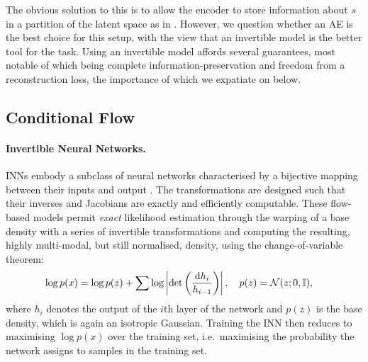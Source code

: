 The obvious solution to this is to allow the encoder to store information about $s$ in a partition
of the latent space as in  \citet{creager2019flexibly}. 
%
However, we question whether an \ac{AE} is the best choice for this setup, with the view that an
invertible model is the better tool for the task. 
%
Using an invertible model affords several guarantees, most notable of which being complete
information-preservation and freedom from a reconstruction loss, the importance of which we
expatiate on below.

\subsection{Conditional Flow}\label{cflow}
%
\paragraph{Invertible Neural Networks.}
%
\Acp{INN} embody a subclass of neural networks characterised by a bijective mapping between their
inputs and output \citep{Dinh2014}. 
%
The transformations are designed such that their inverses and Jacobians are exactly and efficiently
computable.
%
These flow-based models permit \emph{exact} likelihood estimation \citep{normflows2015} through the
warping of a base density with a series of invertible transformations and computing the resulting,
highly multi-modal, but still normalised, density, using the change-of-variable theorem:
%
\begin{align}
\begin{split}
  \log p(x) &= \log p(z) + 
   \sum \log \left| \det\left( \frac{\diff h_i}{ h_{i-1}}\right) \right|, %
  \quad p(z) = \gN(z; 0, \sI),
  \label{eq:changeofvariables}
\end{split}
\end{align}
%
where $h_i$ denotes the output of the \(i\)th layer of the network and $p(z)$ is the base density,
which is again an isotropic Gaussian. 
%
Training the \ac{INN} then reduces to maximising $\log p(x)$ over the training set, i.e.\ maximising the
probability the network assigns to samples in the training set.
%
